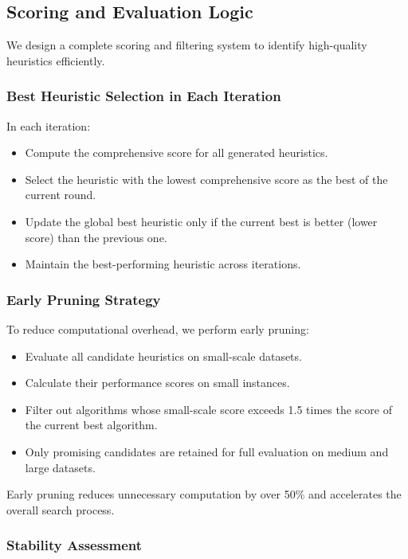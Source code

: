 \documentclass{article}
\begin{document}
\subsection{Scoring and Evaluation Logic}

We design a complete scoring and filtering system to identify high-quality heuristics efficiently.

\subsubsection{Best Heuristic Selection in Each Iteration}

In each iteration:
\begin{itemize}
    \item Compute the comprehensive score for all generated heuristics.
    \item Select the heuristic with the lowest comprehensive score as the best of the current round.
    \item Update the global best heuristic only if the current best is better (lower score) than the previous one.
    \item Maintain the best-performing heuristic across iterations.
\end{itemize}

\subsubsection{Early Pruning Strategy}

To reduce computational overhead, we perform early pruning:
\begin{itemize}
    \item Evaluate all candidate heuristics on small-scale datasets.
    \item Calculate their performance scores on small instances.
    \item Filter out algorithms whose small-scale score exceeds 1.5 times the score of the current best algorithm.
    \item Only promising candidates are retained for full evaluation on medium and large datasets.
\end{itemize}

Early pruning reduces unnecessary computation by over 50\% and accelerates the overall search process.

\subsubsection{Stability Assessment}
\end{document}

